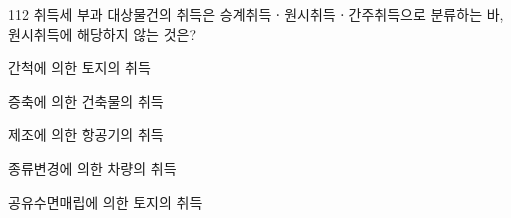 \begin{question}{112}
취득세 부과 대상물건의 취득은 승계취득ㆍ원시취득ㆍ간주취득으로 분류하는 바, 원시취득에 해당하지 않는 것은?
\begin{choices}
  \item 간척에 의한 토지의 취득
  \item 증축에 의한 건축물의 취득
  \item 제조에 의한 항공기의 취득
  \item 종류변경에 의한 차량의 취득
  \item 공유수면매립에 의한 토지의 취득
\end{choices}
\end{question}
